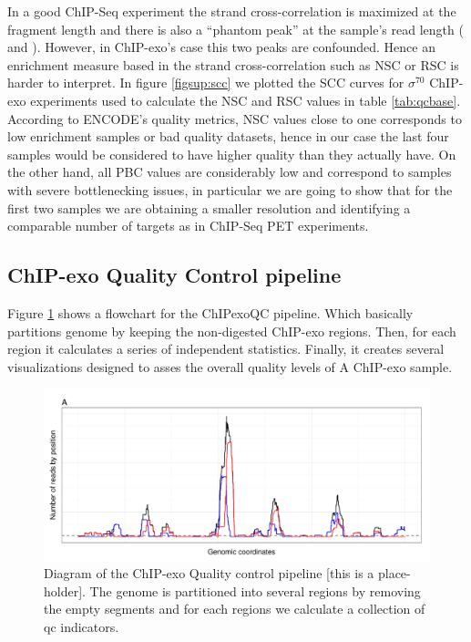 \documentclass{bmcart}\usepackage[]{graphicx}\usepackage[]{color}
\begin{document}
In a good ChIP-Seq experiment the strand cross-correlation is
maximized at the fragment length and there is also a ``phantom peak''
at the sample's read length (\cite{encode_qc} and \cite{strandcc}).
However, in ChIP-exo's case this two peaks are confounded. Hence an
enrichment measure based in the strand cross-correlation such as NSC
or RSC is harder to interpret. In figure \ref{figsup:scc} we plotted
the SCC curves for $\sigma^{70}$ ChIP-exo experiments used to
calculate the NSC and RSC values in table \ref{tab:qcbase}. According
to ENCODE's quality metrics, NSC values close to one corresponds to
low enrichment samples or bad quality datasets, hence in our case the
last four samples would be considered to have higher quality than they
actually have. On the other hand, all PBC values are considerably low
and correspond to samples with severe bottlenecking issues, in
particular we are going to show that for the first two samples we are
obtaining a smaller resolution and identifying a comparable number of
targets as in ChIP-Seq PET experiments.


\subsection{ChIP-exo Quality Control pipeline}
\label{sec:QC}

Figure \ref{fig:qcdiagram} shows a flowchart for the ChIPexoQC
pipeline. Which basically partitions genome by keeping the
non-digested ChIP-exo regions. Then, for each region it calculates a
series of independent statistics. Finally, it creates several
visualizations designed to asses the overall quality levels of A
ChIP-exo sample.

\begin{figure}[h!]
  \centering
  \includegraphics[width = .9\textwidth]{../figs/for_paper/coverage_diagram.pdf}
  \caption{Diagram of the ChIP-exo Quality control pipeline [this is a
    place-holder]. The genome is partitioned into several regions by
    removing the empty segments and for each regions we calculate a
    collection of qc indicators.}
  \label{fig:qcdiagram}
\end{figure}
\end{document}
